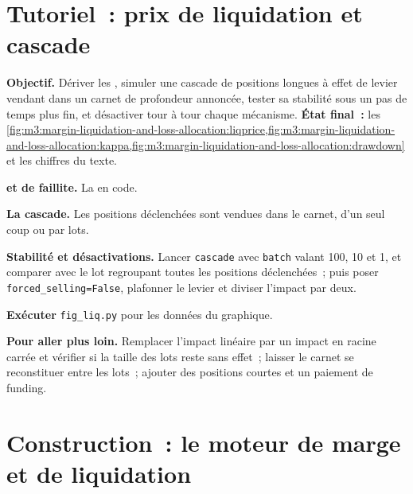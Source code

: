 \section{Tutoriel~: prix de liquidation et cascade}\label{tut:m3:margin-liquidation-and-loss-allocation:cascade}

\begin{tutorial}
\textbf{Objectif.} Dériver les , simuler une cascade de positions longues à effet de levier vendant dans un carnet de profondeur annoncée, tester
sa stabilité sous un pas de temps plus fin, et désactiver tour à tour chaque mécanisme. \textbf{État final~:}
les \cref{fig:m3:margin-liquidation-and-loss-allocation:liqprice,fig:m3:margin-liquidation-and-loss-allocation:kappa,fig:m3:margin-liquidation-and-loss-allocation:drawdown}
et les chiffres du texte.
\begin{tutsteps}
\item \textbf{ et de faillite.} La  en code.
\label{lst:m3:margin-liquidation-and-loss-allocation:liq}
\item \textbf{La cascade.} Les positions déclenchées sont vendues dans le carnet, d'un seul coup ou par lots.
\label{lst:m3:margin-liquidation-and-loss-allocation:cascade}
\item \textbf{Stabilité et désactivations.} Lancer \texttt{cascade} avec \texttt{batch} valant 100, 10 et 1, et comparer avec le
lot regroupant toutes les positions déclenchées~; puis poser \texttt{forced\_selling=False}, plafonner le levier et diviser l'impact par deux.
\item \textbf{Exécuter} \texttt{fig\_liq.py} pour les données du graphique.
\end{tutsteps}
\textbf{Pour aller plus loin.} Remplacer l'impact linéaire par un impact en racine carrée et vérifier si la taille des lots
reste sans effet~; laisser le carnet se reconstituer entre les lots~; ajouter des positions courtes et un paiement de funding.
\end{tutorial}

\section{Construction~: le moteur de marge et de liquidation}\label{bld:m3:margin-liquidation-and-loss-allocation:liquidation}

